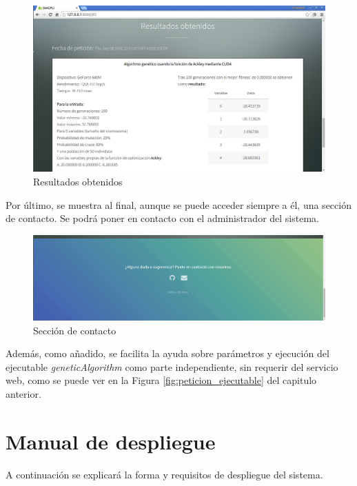 \bigskip
\begin{figure}[h]
	\centering
	\includegraphics[width=1\linewidth]{../images/captura_web_4}
	\caption[Resultados obtenidos]{Resultados obtenidos}
	\label{fig:captura_web_4}
\end{figure}


\newpage
\bigskip
Por último, se muestra al final, aunque se puede acceder siempre a él, una sección de contacto. Se podrá poner en contacto con el administrador del sistema.

\bigskip
\begin{figure}[h]
	\centering
	\includegraphics[width=0.9\linewidth]{../images/captura_web_5}
	\caption[Sección de contacto]{Sección de contacto}
	\label{fig:captura_web_5}
\end{figure}


\bigskip
Además, como añadido, se facilita la ayuda sobre parámetros y ejecución del ejecutable \textit{geneticAlgorithm} como parte independiente, sin requerir del servicio web, como se puede ver en la Figura \ref{fig:peticion_ejecutable} del capitulo anterior.


\newpage
\section{Manual de despliegue}
\bigskip

A continuación se explicará la forma y requisitos de despliegue del sistema. 

